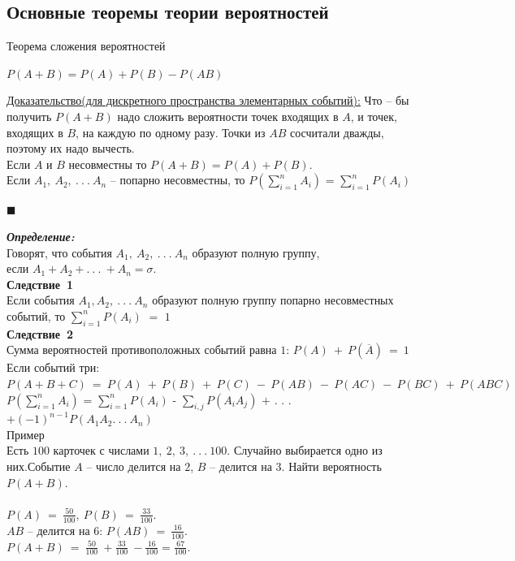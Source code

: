 \documentclass[russian, 12pt, fleqn]{article}
\begin{document}
\subsection{Основные теоремы теории вероятностей}
$\textbf{Теорема сложения вероятностей}$
\begin{tabbing}
\qquad\qquad$P(A + B) = P(A) + P(B)  -  P(AB)$
\end{tabbing}
\underline{Доказательство(для дискретного пространства элементарных событий):} Что -- бы получить $P(A + B)$ надо сложить вероятности точек входящих в $A$, и точек, входящих в $B$, на каждую по одному разу. Точки из $AB$ сосчитали дважды, поэтому их надо вычесть.\\
Если $A$ и $B$ несовместны то $P(A+B)=P(A)+P(B)$.\\
Если $A_1,\ A_2,\ .\ .\ .\ A_n$ -- попарно несовместны, то $\displaystyle{
P \left( \sum\limits_{i=1}^{n}A_i  \right)
}$ = $\sum\limits_{i=1}^{n}P(A_i)$
\begin{flushright}\(\blacksquare\)\end{flushright}
\textit{\textbf{Определение:}}\\ Говорят, что события $A_1, \ A_2,\ .\ .\ .\ A_n$ образуют полную группу, \\если $A_1+A_2+.\ .\ .\ +A_n=\sigma$.\\
\textbf{Следствие\ 1}\\ Если события $A_1,A_2,\ .\ .\ .\ A_n$ образуют полную группу попарно несовместных событий, то  $\sum\limits_{i=1}^{n}P(A_i)$ $=$ $1$\\
\textbf{Следствие\ 2} \\Сумма вероятностей противоположных событий равна $1$: $P(A)\ +\ P(\overline{A})\ =\ 1$\\
Если событий три:\\
$P(A+B+C)\  = \ P(A)\ +\ P(B)\ +\ P(C)\ -\ P(AB)\ -\  P(AC)\ -\ P(BC)\ +\ P(ABC)$\\
$
\displaystyle{
P \left( \sum\limits_{i=1}^{n}A_i  \right)
}
$
 = $\sum\limits_{i=1}^{n}P(A_i)$ - $\sum\limits_{i,j}P(A_iA_j)$ $+$ . . . $+(-1)^{n-1}P(A_1A_2 .\ .\ .\ A_n)$\\
$\textbf{Пример}$\\  Есть $100$ карточек с числами $1,\ 2,\ 3,\ .\ .\ .\ 100.$ Случайно выбирается одно из них.Событие $A$ -- число делится на $2$, $B$ -- делится на $3$. Найти вероятность $P(A+B)$.\\
\\
$P(A)\ =\ \frac{50}{100},\ P(B)\ =\ \frac{33}{100}$.\\  $AB$ -- делится на $6$: $P(AB)\ =\ \frac{16}{100}$. \\$P(A+B)\ =\ \frac{50}{100}\ + \frac{33}{100}\ -\frac{16}{100}=\frac{67}{100}$. \\\\
\end{document}
